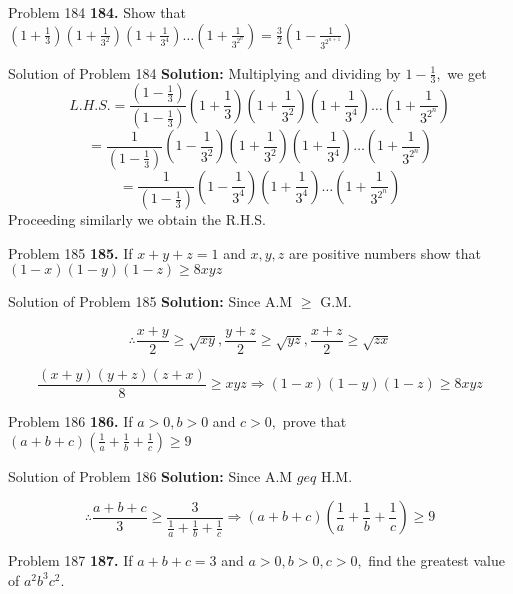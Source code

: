 \documentclass[aspectratio=1610,8pt]{beamer}
\begin{document}
\begin{frame}{Problem 184}
  \textbf{184.} Show that $\left(1 + \frac{1}{3}\right)\left(1 + \frac{1}{3^2}\right)\left(1 + \frac{1}{3^4}\right) \ldots \left(1
  + \frac{1}{3^{2^{n}}}\right) = \frac{3}{2}\left(1 - \frac{1}{3^{2^{n + 1}}}\right)$
\end{frame}
\begin{frame}{Solution of Problem 184}
  \textbf{Solution:} Multiplying and dividing by $1 - \frac{1}{3},$ we get
  $$L.H.S. = \frac{\left(1 - \frac{1}{3}\right)}{\left(1 - \frac{1}{3}\right)}\left(1 + \frac{1}{3}\right)\left(1 +
  \frac{1}{3^2}\right)\left(1 + \frac{1}{3^4}\right) \ldots \left(1 + \frac{1}{3^{2^{n}}}\right)$$
  $$= \frac{1}{\left(1 - \frac{1}{3}\right)}\left(1 - \frac{1}{3^2}\right)\left(1 + \frac{1}{3^2}\right)\left(1 +
  \frac{1}{3^4}\right) \ldots \left(1 + \frac{1}{3^{2^{n}}}\right)$$
  $$= \frac{1}{\left(1 - \frac{1}{3}\right)}\left(1 - \frac{1}{3^4}\right)\left(1 + \frac{1}{3^4}\right) \ldots \left(1 +
  \frac{1}{3^{2^{n}}}\right)$$
  Proceeding similarly we obtain the R.H.S.
\end{frame}
\begin{frame}{Problem 185}
  \textbf{185.} If $x + y + z = 1$ and $x, y, z$ are positive numbers show that $(1 - x)(1 - y)(1 - z)\geq 8xyz$
\end{frame}
\begin{frame}{Solution of Problem 185}
  \textbf{Solution:} Since A.M $\geq$ G.M.

  $$\therefore \frac{x + y}{2}\geq \sqrt{xy}, \frac{y + z}{2}\geq \sqrt{yz}, \frac{x + z}{2}\geq \sqrt{zx}$$

  $$\frac{(x + y)(y + z)(z + x)}{8}\geq xyz \Rightarrow (1 - x)(1 - y)(1 - z)\geq 8xyz$$
\end{frame}
\begin{frame}{Problem 186}
  \textbf{186.} If $a>0, b > 0$ and $c> 0,$ prove that $(a + b + c)\left(\frac{1}{a} + \frac{1}{b} + \frac{1}{c}\right)\geq 9$
\end{frame}
\begin{frame}{Solution of Problem 186}
  \textbf{Solution:} Since A.M $geq$ H.M.

  $$\therefore \frac{a + b + c}{3}\geq \frac{3}{\frac{1}{a} + \frac{1}{b} + \frac{1}{c}} \Rightarrow (a + b + c)\left(\frac{1}{a} +
  \frac{1}{b} + \frac{1}{c}\right)\geq 9$$
\end{frame}
\begin{frame}{Problem 187}
  \textbf{187.} If $a + b + c = 3$ and $a>0, b>0, c>0,$ find the greatest value of $a^2b^3c^2.$
\end{frame}
\end{document}
